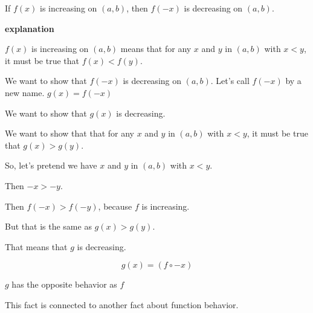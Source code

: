 \documentclass{ximera}
\begin{document}
\begin{fact}

If $f(x)$ is increasing on $(a, b)$, then $f(-x)$ is decreasing on $(a, b)$.

\textbf{\textcolor{red!75!green}{explanation}} 

$f(x)$ is increasing on $(a, b)$ means that for any $x$ and $y$ in $(a, b)$ with $x < y$, it must be true that $f(x) < f(y)$.


We want to show that $f(-x)$ is decreasing on $(a, b)$.  Let's call $f(-x)$ by a new name.  $g(x) = f(-x)$

We want to show that $g(x)$ is decreasing.

We want to show that that for any $x$ and $y$ in $(a, b)$ with $x < y$, it must be true that $g(x) > g(y)$.



So, let's pretend we have $x$ and $y$ in $(a, b)$ with $x < y$.

Then $-x > -y$.

Then $f(-x) > f(-y)$, because $f$ is increasing.

But that is the same as $g(x) > g(y)$.

That means that $g$ is decreasing.


\[ g(x) = (f \circ -x) \]

\begin{center}
$g$ has the opposite behavior as $f$
\end{center}

\end{fact}















This fact is connected to another fact about function behavior.
\end{document}
